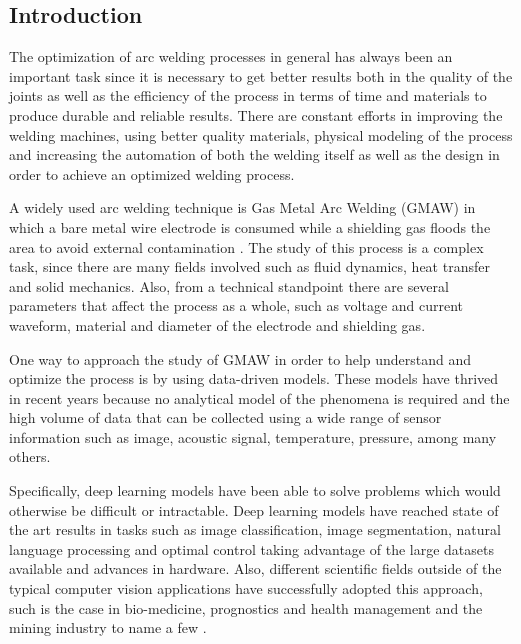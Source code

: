 \begin{intro}
\section{Introduction}
The optimization of arc welding processes in general has always been an important task since it is necessary to get better results both in the quality of the joints as well as the efficiency of the process in terms of time and materials to produce durable and reliable results. There are constant efforts in improving the welding machines, using better quality materials, physical modeling of the process and increasing the automation of both the welding itself as well as the design in order to achieve an optimized welding process.

A widely used arc welding technique is Gas Metal Arc Welding (GMAW) in which a bare metal wire electrode is consumed while a shielding gas floods the area to avoid external contamination \cite{weld-review}. The study of this process is a complex task, since there are many fields involved such as fluid dynamics, heat transfer and solid mechanics. Also, from a technical standpoint there are several parameters that affect the process as a whole, such as voltage and current waveform, material and diameter of the electrode and shielding gas.

One way to approach the study of GMAW in order to help understand and optimize the process is by using data-driven models. These models have thrived in recent years because no analytical model of the phenomena is required and the high volume of data that can be collected using a wide range of sensor information such as image, acoustic signal, temperature, pressure, among many others. 

Specifically, deep learning models have been able to solve problems which would otherwise be difficult or intractable. Deep learning models have reached state of the art results in tasks such as image classification, image segmentation, natural language processing and optimal control taking advantage of the large datasets available \cite{dl-review} and advances in hardware. Also, different scientific fields outside of the typical computer vision applications have successfully adopted this approach, such is the case in bio-medicine, prognostics and health management and the mining industry to name a few \cite{Ronneberger, Reza, Jia}.


\end{intro}
